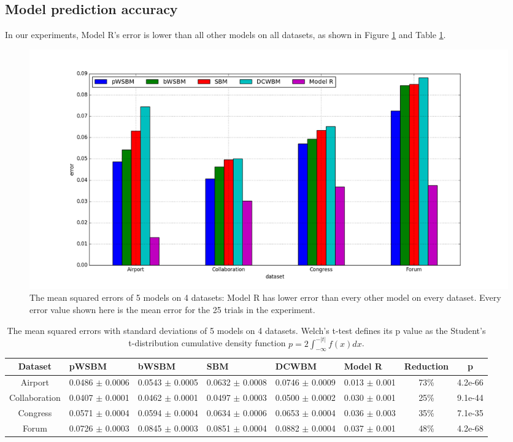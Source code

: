 \documentclass[12pt]{WSUThesis}
\theoremstyle{definition}
\begin{document}
\subsection{Model prediction accuracy}
In our experiments,
Model R's error is lower than all other models on all datasets,
as shown in Figure \ref{fig:errors} and Table \ref{tab:errors}.
\begin{figure}[!ht]\centering
	\includegraphics[width=1\textwidth]{link-weight-errors}
	\caption{
		The mean squared errors of 5 models on 4 datasets:
		Model R has lower error than every other model on every dataset.
		Every error value shown here is the mean error for the 25 trials in the experiment.
	}
	\label{fig:errors}
\end{figure}
\begin{table}[!htb]\centering
	\caption{
		The mean squared errors with standard deviations of 5 models on 4 datasets.
		Welch's t-test defines its p value as the Student's t-distribution cumulative density function $ p = 2 \int_{-\infty}^{-|t|} f(x) dx $.
	}
	\begin{tabularx}{\textwidth}{|c|X|X|X|X|X|c|c|} \hline \rowcolor{blue!30}
		Dataset & pWSBM & bWSBM & SBM & DCWBM & Model R & Reduction & p \\ \hline
		Airport & 0.0486 $ \pm $ 0.0006 & 0.0543 $ \pm $ 0.0005 & 0.0632 $ \pm $ 0.0008 & 0.0746 $ \pm $ 0.0009 & 0.013 $ \pm $ 0.001 & 73\% & 4.2e-66 \\ \hline
		Collaboration & 0.0407 $ \pm $ 0.0001 & 0.0462 $ \pm $ 0.0001 & 0.0497 $ \pm $ 0.0003 & 0.0500 $ \pm $ 0.0002 & 0.030 $ \pm $ 0.001 & 25\% & 9.1e-44 \\ \hline
		Congress & 0.0571 $ \pm $ 0.0004 & 0.0594 $ \pm $ 0.0004 & 0.0634 $ \pm $ 0.0006 & 0.0653 $ \pm $ 0.0004 & 0.036 $ \pm $ 0.003 & 35\% & 7.1e-35 \\ \hline
		Forum & 0.0726 $ \pm $ 0.0003 & 0.0845 $ \pm $ 0.0003 & 0.0851 $ \pm $ 0.0004 & 0.0882 $ \pm $ 0.0004 & 0.037 $ \pm $ 0.001 & 48\% & 4.2e-68 \\ \hline
	\end{tabularx}
	\label{tab:errors}
\end{table}
\end{document}
